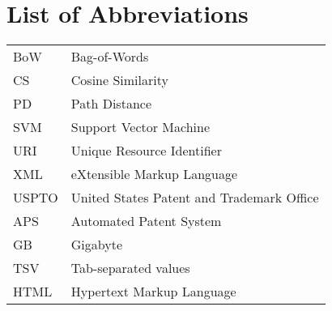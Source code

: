 \chapter*{List of Abbreviations}
\label{cha:glossary}

\begin{table}[htbp]
    \begin{center}
        \begin{tabularx}{\textwidth}{lX}
            BoW & Bag-of-Words \\
            CS & Cosine Similarity \\
            PD & Path Distance \\
            SVM & Support Vector Machine \\
            URI & Unique Resource Identifier \\
            XML & eXtensible Markup Language \\
            USPTO & United States Patent and Trademark Office \\
            APS & Automated Patent System \\
            GB & Gigabyte \\
            TSV & Tab-separated values \\
            HTML & Hypertext Markup Language \\
        \end{tabularx}
    \end{center}
    \label{tab:glossary}
\end{table}